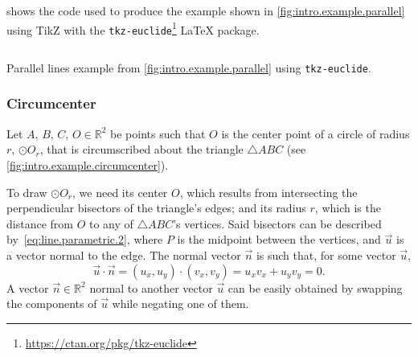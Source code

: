  shows the code used to produce the
example shown in \cref{fig:intro.example.parallel} using \acs{TikZ} with the
\texttt{tkz-euclide}\footnote{\url{https://ctan.org/pkg/tkz-euclide}} \LaTeX{}
package.

\begin{listing}[htb]
  \inputminted[highlightlines=3]{latex}{tikz/ex-parallel.tikz}
  \caption[Parallel lines example using \texttt{tkz-euclide}]{
    Parallel lines example from \cref{fig:intro.example.parallel} using
    \texttt{tkz-euclide}.}%
  \label{lst:intro.example.parallel.tikz}
\end{listing}

\subsubsection{Circumcenter}%
\label{sec:intro.examples.circumcenter}

Let $A,\, B,\, C,\, O \in \mathbb{R}^2$ be points such that $O$ is the center
point of a circle of radius $r$, $\odot O_r$, that is circumscribed about the
triangle $\triangle ABC$ (see \cref{fig:intro.example.circumcenter}).

To draw $\odot O_r$, we need its center $O$, which results from intersecting
the perpendicular bisectors of the triangle's edges; and its radius $r$, which
is the distance from $O$ to any of $\triangle ABC$'s vertices.  Said bisectors
can be described by~\cref{eq:line.parametric.2}, where $P$ is the midpoint
between the vertices, and $\vec{u}$ is a vector normal to the edge.  The normal
vector $\vec{n}$ is such that, for some vector $\vec{u}$,
\[
  \vec{u} \cdot \vec{n} = (u_x, u_y) \cdot (v_x, v_y) = u_x v_x + u_y v_y = 0.
\]
A vector $\vec{n} \in \mathbb{R}^2$ normal to another vector $\vec{u}$ can be
easily obtained by swapping the components of $\vec{u}$ while negating one of
them.

